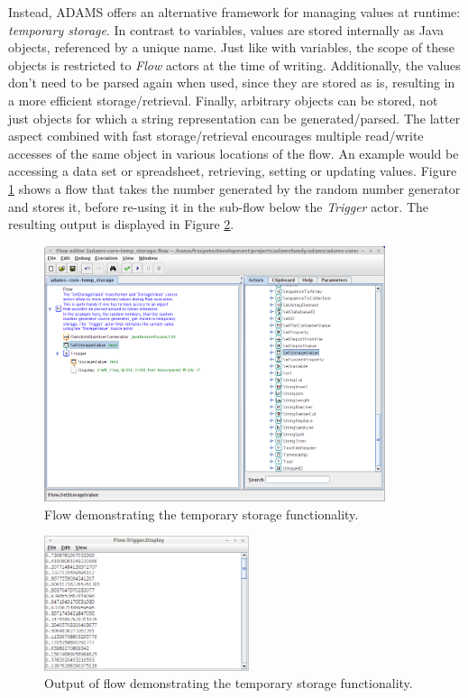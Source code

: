 Instead, ADAMS offers an alternative framework for managing values at runtime:
\textit{temporary storage}. In contrast to variables, values are stored
internally as Java objects, referenced by a unique name. Just like with
variables, the scope of these objects is restricted to \textit{Flow} actors at
the time of writing. Additionally, the values don't need to be parsed again
when used, since they are stored as is, resulting in a more efficient
storage/retrieval. Finally, arbitrary objects can be stored, not just objects
for which a string representation can be generated/parsed. The latter aspect
combined with fast storage/retrieval encourages multiple read/write accesses of
the same object in various locations of the flow. An example would be accessing
a data set or spreadsheet, retrieving, setting or updating values. Figure
\ref{floweditor-storage1_flow} shows a flow that takes the number generated by
the random number generator and stores it, before re-using it in the sub-flow
below the \textit{Trigger} actor. The resulting output is displayed in Figure
\ref{floweditor-storage1_output}.

\begin{figure}[htb]
  \centering
  \includegraphics[width=10.0cm]{images/floweditor-storage1_flow.png}
  \caption{Flow demonstrating the temporary storage functionality.}
  \label{floweditor-storage1_flow}
\end{figure}

\begin{figure}[htb]
  \centering
  \includegraphics[width=6.0cm]{images/floweditor-storage1_output.png}
  \caption{Output of flow demonstrating the temporary storage
  functionality.}
  \label{floweditor-storage1_output}
\end{figure}

